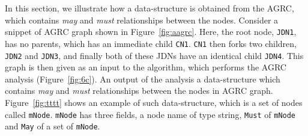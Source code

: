 In this section, we illustrate how a data-structure is obtained from the
AGRC, which contains \textit{may} and \textit{must} relationships
between the nodes. Consider a snippet of AGRC graph shown in
Figure~\ref{fig:aagrc}. Here, the root node, \texttt{JDN1}, has no
parents, which has an immediate child \texttt{CN1}. \texttt{CN1} then
forks two children, \texttt{JDN2} and \texttt{JDN3}, and finally both of
these JDNs have an identical child \texttt{JDN4}. This graph is then
given as an input to the algorithm, which performs the AGRC analysis
(Figure~\ref{fig:6c}). An output of the analysis a data-structure which
contains \textit{may} and \textit{must} relationships between the nodes
in AGRC graph. Figure~\ref{fig:tttt} shows an example of such
data-structure, which is a set of nodes called \texttt{mNode}.
\texttt{mNode} has three fields, a node name of type string,
\texttt{Must} of \texttt{mNode} and \texttt{May} of a set of
\texttt{mNode}.





